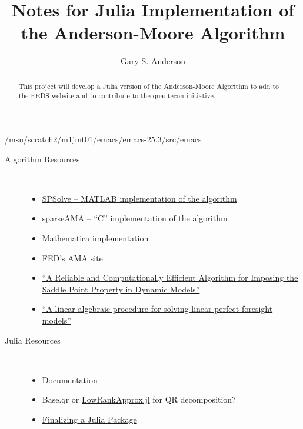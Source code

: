 \documentclass[12pt]{article}
\title{Notes for Julia Implementation of the Anderson-Moore Algorithm}
\author{Gary S. Anderson}
\begin{document}
\maketitle

/msu/scratch2/m1jmt01/emacs/emacs-25.3/src/emacs
\begin{abstract}
  This project will develop a Julia version of the Anderson-Moore Algorithm to add to the \href{https://www.federalreserve.gov/econres/ama-index.htm}{FEDS website}  and to contribute to the \href{http://quantecon.org/quantecon.jl}{quantecon initiative.}  
\end{abstract}
\begin{description}
\item[Algorithm Resources] \ 
\begin{itemize}
\item \href{https://github.com/es335mathwiz/SPSolve.git}{SPSolve -- MATLAB implementation of the algorithm}
\item \href{https://github.com/es335mathwiz/sparseAMA.git}{sparseAMA -- ``C'' implementation of the algorithm}
\item \href{https://github.com/es335mathwiz/mathAMA.git}{Mathematica implementation}
\item \href{https://www.federalreserve.gov/econres/ama-index.htm}{FED's AMA site}
\item \href{https://www.sciencedirect.com/science/article/pii/S1474667017405064}{``A Reliable and Computationally Efficient Algorithm for Imposing the Saddle Point Property in Dynamic Models''}
\item \href{https://www.sciencedirect.com/science/article/pii/0165176585902113}{``A linear algebraic procedure for solving linear perfect foresight models''}
\end{itemize}
\item[Julia Resources] \
  \begin{itemize}
  \item \href{https://docs.julialang.org/en/stable/}{Documentation}
  \item Base.qr or \href{https://github.com/JuliaMatrices/LowRankApprox.jl}{LowRankApprox.jl} for QR decomposition?
  \item \href{http://www.stochasticlifestyle.com/finalizing-julia-package-documentation-testing-coverage-publishing/}{Finalizing a Julia Package}

\end{itemize}
\end{description}
\end{document}

